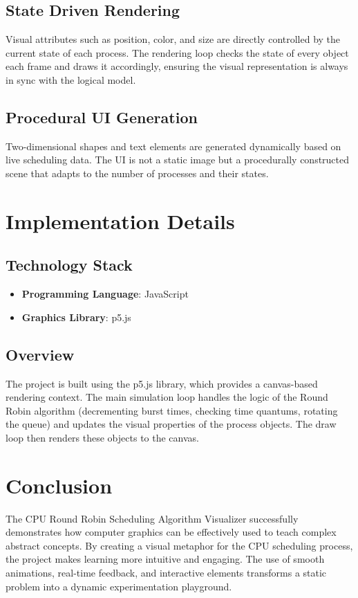 \documentclass[12pt, a4paper]{report}
\begin{document}
\section{State Driven Rendering}
Visual attributes such as position, color, and size are directly controlled by the current state of each process. The rendering loop checks the state of every object each frame and draws it accordingly, ensuring the visual representation is always in sync with the logical model.

\section{Procedural UI Generation}
Two-dimensional shapes and text elements are generated dynamically based on live scheduling data. The UI is not a static image but a procedurally constructed scene that adapts to the number of processes and their states.

\chapter{Implementation Details}

\section{Technology Stack}
\begin{itemize}
    \item \textbf{Programming Language}: JavaScript
    \item \textbf{Graphics Library}: p5.js
\end{itemize}

\section{Overview}
The project is built using the p5.js library, which provides a canvas-based rendering context. The main simulation loop handles the logic of the Round Robin algorithm (decrementing burst times, checking time quantums, rotating the queue) and updates the visual properties of the process objects. The draw loop then renders these objects to the canvas.

\chapter{Conclusion}

The CPU Round Robin Scheduling Algorithm Visualizer successfully demonstrates how computer graphics can be effectively used to teach complex abstract concepts. By creating a visual metaphor for the CPU scheduling process, the project makes learning more intuitive and engaging. The use of smooth animations, real-time feedback, and interactive elements transforms a static problem into a dynamic experimentation playground.
\end{document}
